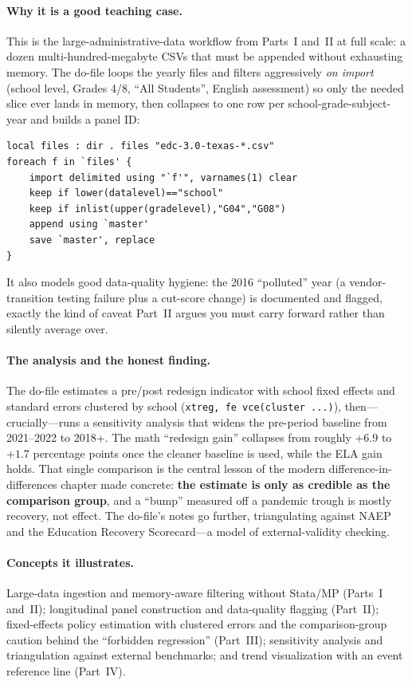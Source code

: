 \documentclass[
    a4paper,
    fontsize=10pt,
    twoside=true,
    numbers=noenddot,
]{kaobook}
\begin{document}
\paragraph{Why it is a good teaching case.} This is the large-administrative-data workflow from Parts~I and~II at full scale: a dozen multi-hundred-megabyte CSVs that must be appended without exhausting memory. The do-file loops the yearly files and filters aggressively \emph{on import} (school level, Grades 4/8, \enquote{All Students}, English assessment) so only the needed slice ever lands in memory, then collapses to one row per school-grade-subject-year and builds a panel ID:
{\footnotesize
\begin{verbatim}
local files : dir . files "edc-3.0-texas-*.csv"
foreach f in `files' {
    import delimited using "`f'", varnames(1) clear
    keep if lower(datalevel)=="school"
    keep if inlist(upper(gradelevel),"G04","G08")
    append using `master'
    save `master', replace
}
\end{verbatim}
}
It also models good data-quality hygiene: the 2016 \enquote{polluted} year (a vendor-transition testing failure plus a cut-score change) is documented and flagged, exactly the kind of caveat Part~II argues you must carry forward rather than silently average over.

\paragraph{The analysis and the honest finding.} The do-file estimates a pre/post redesign indicator with school fixed effects and standard errors clustered by school (\texttt{xtreg, fe vce(cluster ...)}), then---crucially---runs a sensitivity analysis that widens the pre-period baseline from 2021--2022 to 2018+. The math \enquote{redesign gain} collapses from roughly $+6.9$ to $+1.7$ percentage points once the cleaner baseline is used, while the ELA gain holds. That single comparison is the central lesson of the modern difference-in-differences chapter made concrete: \textbf{the estimate is only as credible as the comparison group}, and a \enquote{bump} measured off a pandemic trough is mostly recovery, not effect. The do-file's notes go further, triangulating against NAEP and the Education Recovery Scorecard---a model of external-validity checking.

\paragraph{Concepts it illustrates.} Large-data ingestion and memory-aware filtering without Stata/MP (Parts~I and~II); longitudinal panel construction and data-quality flagging (Part~II); fixed-effects policy estimation with clustered errors and the comparison-group caution behind the \enquote{forbidden regression} (Part~III); sensitivity analysis and triangulation against external benchmarks; and trend visualization with an event reference line (Part~IV).

\backmatter
\printbibliography[heading=bibintoc, title=Bibliography]
\end{document}
